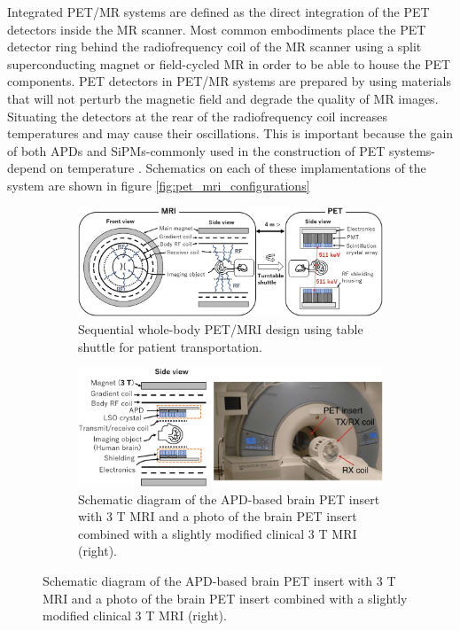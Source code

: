 \begin{multicols}{2}
Integrated PET/MR systems are defined as the direct integration of the PET detectors inside the MR scanner. Most common embodiments place the PET detector ring behind the radiofrequency coil of the MR scanner using a split superconducting magnet or field-cycled MR in order to be able to house the PET components. PET detectors in PET/MR systems are prepared by using materials that will not perturb the magnetic field and degrade the quality of MR images. Situating the detectors at the rear of the radiofrequency coil increases temperatures and may cause their oscillations. This is important because the gain of both APDs and SiPMs-commonly used in the construction of PET systems-depend on temperature \cite{ziegler2013,Muzic2014}. Schematics on each of these implamentations of the system are shown in figure \ref{fig:pet_mri_configurations}

\begin{figure}[H]
	\centering
	\begin{subfigure}[b]{0.45\textwidth}
		\centering
		\includegraphics[width=\textwidth]{assets/sequencial.png}
		\caption{Sequential whole-body PET/MRI design using table shuttle for patient transportation.}
		\label{fig:sequential}
	\end{subfigure}
	\begin{subfigure}[b]{0.45\textwidth}
		\centering
		\includegraphics[width=\textwidth]{assets/insert.png}
		\caption{Schematic diagram of the APD-based brain PET insert with 3 T MRI and a photo of the brain PET insert combined with a slightly modified clinical 3 T MRI (right).}
		\label{fig:insert}
	\end{subfigure}
	

\end{figure}
\end{multicols}
